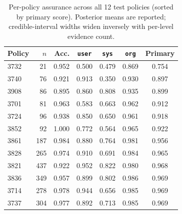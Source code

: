 \documentclass[final,3p,times,twocolumn]{elsarticle}
\begin{document}
	\begin{table}[h]
		\centering
		\caption{Per-policy assurance across all 12 test policies (sorted by primary
		score). Posterior means are reported; credible-interval widths widen
		inversely with per-level evidence count.}
		\label{tab:allpol} \scriptsize
		\setlength{\tabcolsep}{3pt}
		\begin{tabular}{@{}l r r ccc c@{}}
			\toprule \textbf{Policy} & \textbf{$n$} & \textbf{Acc.} & \texttt{user} & \texttt{sys} & \texttt{org} & \textbf{Primary} \\
			\midrule 3732            & 21           & 0.952         & 0.500         & 0.479        & 0.869        & 0.754            \\
			3740                     & 76           & 0.921         & 0.913         & 0.350        & 0.930        & 0.897            \\
			3908                     & 86           & 0.895         & 0.860         & 0.808        & 0.935        & 0.899            \\
			3701                     & 81           & 0.963         & 0.583         & 0.663        & 0.962        & 0.912            \\
			3724                     & 96           & 0.938         & 0.850         & 0.650        & 0.961        & 0.918            \\
			3852                     & 92           & 1.000         & 0.772         & 0.564        & 0.965        & 0.922            \\
			3861                     & 187          & 0.984         & 0.880         & 0.764        & 0.981        & 0.956            \\
			3828                     & 265          & 0.974         & 0.910         & 0.691        & 0.984        & 0.965            \\
			3821                     & 437          & 0.922         & 0.952         & 0.822        & 0.980        & 0.968            \\
			3836                     & 349          & 0.957         & 0.899         & 0.802        & 0.986        & 0.969            \\
			3714                     & 278          & 0.978         & 0.944         & 0.656        & 0.985        & 0.969            \\
			3737                     & 304          & 0.977         & 0.892         & 0.713        & 0.985        & 0.969            \\
			\bottomrule
		\end{tabular}
	\end{table}
\end{document}
